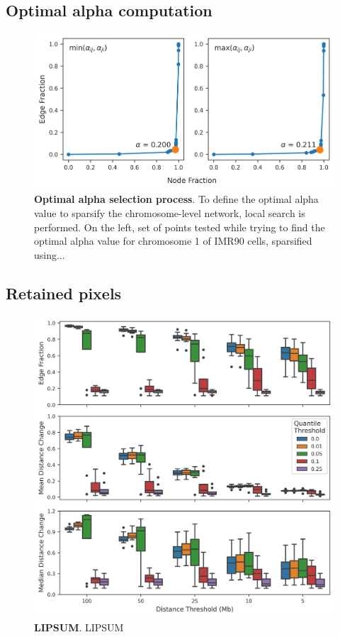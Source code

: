 \subsection{Optimal alpha computation}

\begin{figure}[h]
  \centering
  \includegraphics[width=1\textwidth]{alpha_tables.png}
  \caption{\textbf{Optimal alpha selection process}. To define the optimal alpha value to sparsify the chromosome-level network, local search is performed. On the left, set of points tested while trying to find the optimal alpha value for chromosome 1 of IMR90 cells, sparsified using... }
  \label{fig:alphas}
\end{figure}


\subsection{Retained pixels}

\begin{figure}[h]
  \centering
  \includegraphics[width=1\textwidth]{filtering_stats.png}
  \caption{\textbf{LIPSUM}. LIPSUM}
  \label{fig:filtering}
\end{figure}


